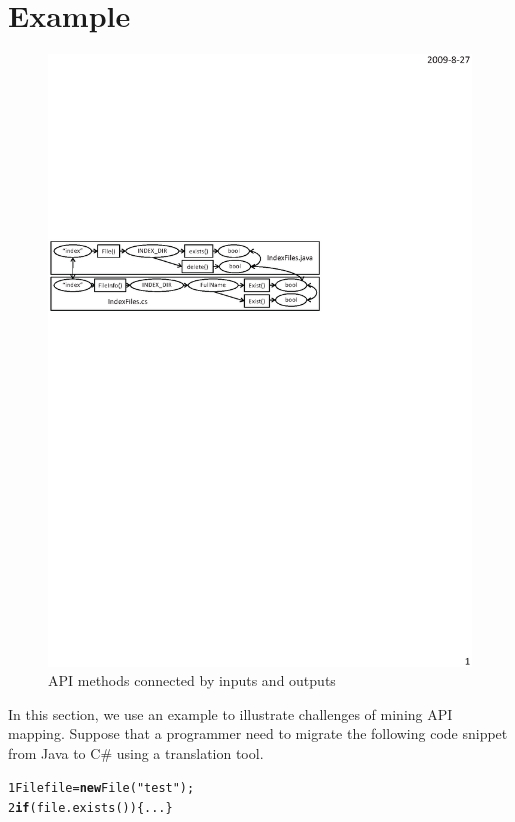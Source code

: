 \section{Example}
\label{sec:example}
\begin{figure}[t]
\centering
\includegraphics[scale=0.8,clip]{figure/dataflow.eps}\vspace*{-1.5ex}
 \caption
{\label{fig:dataflow}API methods connected by inputs and
outputs}\vspace*{-2ex}
\end{figure}
In this section, we use an example to illustrate challenges of
mining API mapping. Suppose that a programmer need to migrate the
following code snippet from Java to C\# using a translation tool.

\begin{CodeOut}\vspace*{-1ex}
\begin{alltt}
1  File file = \textbf{new} File("test");
2    \textbf{if}(file.exists())\{...\}
\end{alltt}
\end{CodeOut}\vspace*{-1ex}


